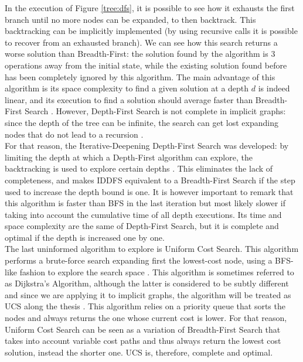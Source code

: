 In the execution of Figure \ref{tree:dfs}, it is possible to see how it
exhausts the first branch until no more nodes can be expanded, to then
backtrack. This backtracking can be implicitly implemented (by using recursive
calls it is possible to recover from an exhausted branch). We can see how this
search returns a worse solution than Breadth-First: the solution found by the
algorithm is 3 operations away from the initial state, while the existing
solution found before has been completely ignored by this algorithm. The main
advantage of this algorithm is its space complexity to find a given solution at
a depth $d$ is indeed linear, and its execution to find a solution should
average faster than Breadth-First Search \cite{zhang-1995-bnb}. However,
Depth-First Search is not complete in implicit graphs: since the depth of the
tree can be infinite, the search can get lost expanding nodes that do not lead
to a recursion \cite{rusell-2003-aima}.\\

For that reason, the Iterative-Deepening Depth-First Search was developed: by
limiting the depth at which a Depth-First algorithm can explore, the
backtracking is used to explore certain depths \cite{korf-1985-depth}. This
eliminates the lack of completeness, and makes IDDFS equivalent to a
Breadth-First Search if the step used to increase the depth bound is one. It is
however important to remark that this algorithm is faster than BFS in the last
iteration but most likely slower if taking into account the cumulative time of
all depth executions. Its time and space complexity are the same of Depth-First
Search, but it is complete and optimal if the depth is increased one by one.\\

The last uninformed algorithm to explore is Uniform Cost Search. This algorithm
performs a brute-force search expanding first the lowest-cost node, using a
BFS-like fashion to explore the search space \cite{rusell-2003-aima}. This
algorithm is sometimes referred to as Dijkstra's Algorithm, although the latter
is considered to be subtly different and since we are applying it to implicit
graphs, the algorithm will be treated as UCS along the thesis
\cite{felner-2011-dijkstra}. This algorithm relies on a priority queue that
sorts the nodes and always returns the one whose current cost is lower. For
that reason, Uniform Cost Search can be seen as a variation of Breadth-First
Search that takes into account variable cost paths and thus always return the
lowest cost solution, instead the shorter one. UCS is, therefore, complete and
optimal.\\

